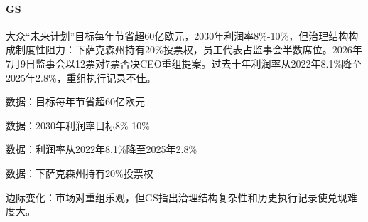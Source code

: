 \documentclass[11pt]{ctexart}
\begin{document}
\paragraph{GS} 大众“未来计划”目标每年节省超60亿欧元，2030年利润率8\%-10\%，但治理结构构成制度性阻力：下萨克森州持有20\%投票权，员工代表占监事会半数席位。2026年7月9日监事会以12票对7票否决CEO重组提案。过去十年利润率从2022年8.1\%降至2025年2.8\%，重组执行记录不佳。
{\small\color{refgray}数据：目标每年节省超60亿欧元\par}
{\small\color{refgray}数据：2030年利润率目标8\%-10\%\par}
{\small\color{refgray}数据：利润率从2022年8.1\%降至2025年2.8\%\par}
{\small\color{refgray}数据：下萨克森州持有20\%投票权\par}
{\small\color{refgray}边际变化：市场对重组乐观，但GS指出治理结构复杂性和历史执行记录使兑现难度大。\par}
\end{document}
